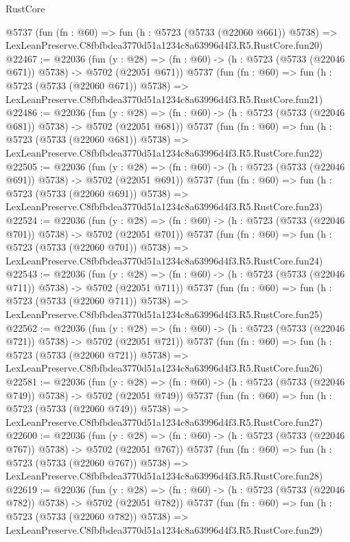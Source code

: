\begin{lexlean}{RustCore}
\begin{coremodule}
    @5737
    (fun (fn : @60) =>
    fun (h : @5723 (@5733 (@22060 @661)) @5738) =>
    LexLeanPreserve.C8fbfbdea3770d51a1234c8a63996d4f3.R5.RustCore.fun20)
@22467 := @22036
    (fun (y : @28) => (fn : @60) -> (h : @5723 (@5733 (@22046 @671)) @5738) -> @5702 (@22051 @671))
    @5737
    (fun (fn : @60) =>
    fun (h : @5723 (@5733 (@22060 @671)) @5738) =>
    LexLeanPreserve.C8fbfbdea3770d51a1234c8a63996d4f3.R5.RustCore.fun21)
@22486 := @22036
    (fun (y : @28) => (fn : @60) -> (h : @5723 (@5733 (@22046 @681)) @5738) -> @5702 (@22051 @681))
    @5737
    (fun (fn : @60) =>
    fun (h : @5723 (@5733 (@22060 @681)) @5738) =>
    LexLeanPreserve.C8fbfbdea3770d51a1234c8a63996d4f3.R5.RustCore.fun22)
@22505 := @22036
    (fun (y : @28) => (fn : @60) -> (h : @5723 (@5733 (@22046 @691)) @5738) -> @5702 (@22051 @691))
    @5737
    (fun (fn : @60) =>
    fun (h : @5723 (@5733 (@22060 @691)) @5738) =>
    LexLeanPreserve.C8fbfbdea3770d51a1234c8a63996d4f3.R5.RustCore.fun23)
@22524 := @22036
    (fun (y : @28) => (fn : @60) -> (h : @5723 (@5733 (@22046 @701)) @5738) -> @5702 (@22051 @701))
    @5737
    (fun (fn : @60) =>
    fun (h : @5723 (@5733 (@22060 @701)) @5738) =>
    LexLeanPreserve.C8fbfbdea3770d51a1234c8a63996d4f3.R5.RustCore.fun24)
@22543 := @22036
    (fun (y : @28) => (fn : @60) -> (h : @5723 (@5733 (@22046 @711)) @5738) -> @5702 (@22051 @711))
    @5737
    (fun (fn : @60) =>
    fun (h : @5723 (@5733 (@22060 @711)) @5738) =>
    LexLeanPreserve.C8fbfbdea3770d51a1234c8a63996d4f3.R5.RustCore.fun25)
@22562 := @22036
    (fun (y : @28) => (fn : @60) -> (h : @5723 (@5733 (@22046 @721)) @5738) -> @5702 (@22051 @721))
    @5737
    (fun (fn : @60) =>
    fun (h : @5723 (@5733 (@22060 @721)) @5738) =>
    LexLeanPreserve.C8fbfbdea3770d51a1234c8a63996d4f3.R5.RustCore.fun26)
@22581 := @22036
    (fun (y : @28) => (fn : @60) -> (h : @5723 (@5733 (@22046 @749)) @5738) -> @5702 (@22051 @749))
    @5737
    (fun (fn : @60) =>
    fun (h : @5723 (@5733 (@22060 @749)) @5738) =>
    LexLeanPreserve.C8fbfbdea3770d51a1234c8a63996d4f3.R5.RustCore.fun27)
@22600 := @22036
    (fun (y : @28) => (fn : @60) -> (h : @5723 (@5733 (@22046 @767)) @5738) -> @5702 (@22051 @767))
    @5737
    (fun (fn : @60) =>
    fun (h : @5723 (@5733 (@22060 @767)) @5738) =>
    LexLeanPreserve.C8fbfbdea3770d51a1234c8a63996d4f3.R5.RustCore.fun28)
@22619 := @22036
    (fun (y : @28) => (fn : @60) -> (h : @5723 (@5733 (@22046 @782)) @5738) -> @5702 (@22051 @782))
    @5737
    (fun (fn : @60) =>
    fun (h : @5723 (@5733 (@22060 @782)) @5738) =>
    LexLeanPreserve.C8fbfbdea3770d51a1234c8a63996d4f3.R5.RustCore.fun29)

\end{coremodule}
\end{lexlean}
